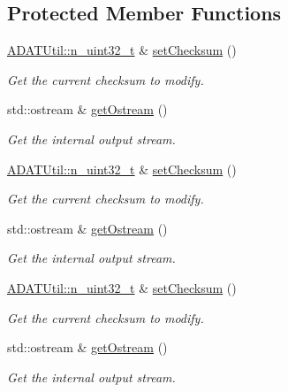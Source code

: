 \subsection*{Protected Member Functions}
\begin{DoxyCompactItemize}
\item 
\mbox{\hyperlink{namespaceADATUtil_ad945a8afa4db2d1f89b731964adae97e}{A\+D\+A\+T\+Util\+::n\+\_\+uint32\+\_\+t}} \& \mbox{\hyperlink{classADATIO_1_1BinaryFileWriter_a0137ec5926d08e49ed7a63c6ef33e882}{set\+Checksum}} ()
\begin{DoxyCompactList}\small\item\em Get the current checksum to modify. \end{DoxyCompactList}\item 
std\+::ostream \& \mbox{\hyperlink{classADATIO_1_1BinaryFileWriter_a2506200a774d4823088a0365e0452d9a}{get\+Ostream}} ()
\begin{DoxyCompactList}\small\item\em Get the internal output stream. \end{DoxyCompactList}\item 
\mbox{\hyperlink{namespaceADATUtil_ad945a8afa4db2d1f89b731964adae97e}{A\+D\+A\+T\+Util\+::n\+\_\+uint32\+\_\+t}} \& \mbox{\hyperlink{classADATIO_1_1BinaryFileWriter_a0137ec5926d08e49ed7a63c6ef33e882}{set\+Checksum}} ()
\begin{DoxyCompactList}\small\item\em Get the current checksum to modify. \end{DoxyCompactList}\item 
std\+::ostream \& \mbox{\hyperlink{classADATIO_1_1BinaryFileWriter_a2506200a774d4823088a0365e0452d9a}{get\+Ostream}} ()
\begin{DoxyCompactList}\small\item\em Get the internal output stream. \end{DoxyCompactList}\item 
\mbox{\hyperlink{namespaceADATUtil_ad945a8afa4db2d1f89b731964adae97e}{A\+D\+A\+T\+Util\+::n\+\_\+uint32\+\_\+t}} \& \mbox{\hyperlink{classADATIO_1_1BinaryFileWriter_a0137ec5926d08e49ed7a63c6ef33e882}{set\+Checksum}} ()
\begin{DoxyCompactList}\small\item\em Get the current checksum to modify. \end{DoxyCompactList}\item 
std\+::ostream \& \mbox{\hyperlink{classADATIO_1_1BinaryFileWriter_a2506200a774d4823088a0365e0452d9a}{get\+Ostream}} ()
\begin{DoxyCompactList}\small\item\em Get the internal output stream. \end{DoxyCompactList}\end{DoxyCompactItemize}


